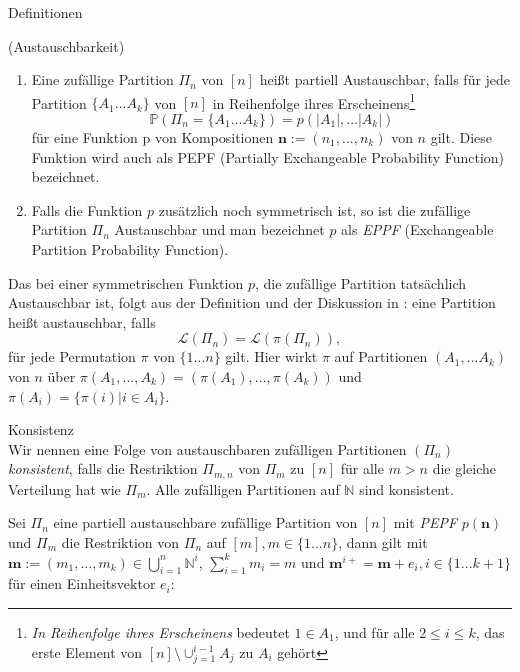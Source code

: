 \begin{section}{Definitionen}
\begin{Definition}
\end{Definition}
\begin{Definition}
    \textnormal{(Austauschbarkeit)}
    \label{Austauschbarkeit}
    \begin{enumerate}
        \item Eine zufällige Partition $\Pi_n$ von $[n]$ heißt partiell Austauschbar, falls für jede Partition $\{ A_1 ... A_k\}$ von $[n]$ in Reihenfolge ihres Erscheinens\footnote{\textit{In Reihenfolge ihres Erscheinens} bedeutet $1 \in A_1$, und für alle $2 \leq i \leq k$, das erste Element von $[n]\setminus \cup_{j=1}^{i-1}A_j$ zu $A_i$ gehört}
        \[ 
            \mathbb{P}(\Pi_n = \{ A_1 ... A_k\}) = p(|A_1|, ... |A_k|)
        \]  
        für eine Funktion p von Kompositionen $\textbf{n}:= (n_1, ..., n_k)$ von $n$ gilt. Diese Funktion wird auch als PEPF (Partially Exchangeable Probability Function) bezeichnet.
        \item Falls die Funktion $p$ zusätzlich noch symmetrisch ist, so ist die zufällige Partition $\Pi_n$ Austauschbar und man bezeichnet $p$ als \textit{EPPF} (Exchangeable Partition Probability Function).
    \end{enumerate}
\end{Definition}
\begin{Bemerkung}
    Das bei einer symmetrischen Funktion $p$, die zufällige Partition tatsächlich Austauschbar ist, folgt aus der Definition und der Diskussion in \cite[Seite 85]{aldous2006ecole}: eine Partition heißt austauschbar, falls 
    \[
         \mathcal{L}(\Pi_n) = \mathcal{L}(\pi(\Pi_{n})),
    \]
    für jede Permutation $\pi$ von $\{1...n\}$ gilt. Hier wirkt $\pi$ auf Partitionen $(A_1,...A_k)$ von $n$ über $\pi(A_1,...,A_k) =(\pi(A_1),...,\pi(A_k)) $ und $\pi(A_i) = \{\pi(i) | i \in A_i\}$.
\end{Bemerkung}
\begin{Definition}{Konsistenz}\\
    Wir nennen eine Folge von austauschbaren zufälligen Partitionen $(\Pi_n)$ \textit{konsistent}, falls die Restriktion $\Pi_{m,n}$ von $\Pi_m$ zu $[n]$ für alle $m > n$ die gleiche Verteilung hat wie $\Pi_m$. Alle zufälligen Partitionen auf $\mathbb{N}$ sind konsistent.
\end{Definition}
\begin{lemma}
    \label{lemma partielle austauschbarkeit}
    Sei $\Pi_n$ eine partiell austauschbare zufällige Partition von $[n]$ mit \textit{PEPF} $p(\textbf{n})$ und $\Pi_m$ die Restriktion von $\Pi_n$ auf $[m], m \in \{1...n\}$, dann gilt mit $\textbf{m} := (m_1,...,m_k)\in \bigcup_{i = 1 }^{n} \mathbb{N}^i$, $\sum_{i=1}^{k}m_i = m$ und $\textbf{m}^{i+} = \textbf{m} + e_i, i \in \{1...k+1\}$ für einen Einheitsvektor $e_i$:

\end{lemma}
\end{section}

